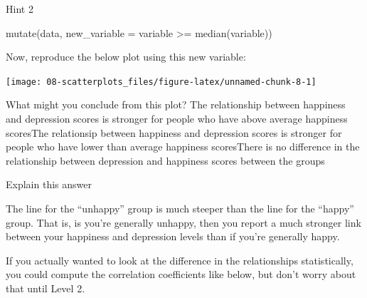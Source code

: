 \documentclass[
  oneside]{book}
\newenvironment{Shaded}{\begin{snugshade}}{\end{snugshade}}
\newcommand{\AttributeTok}[1]{\textcolor[rgb]{0.77,0.63,0.00}{#1}}
\newcommand{\ConstantTok}[1]{\textcolor[rgb]{0.00,0.00,0.00}{#1}}
\newcommand{\FunctionTok}[1]{\textcolor[rgb]{0.00,0.00,0.00}{#1}}
\newcommand{\NormalTok}[1]{#1}
\newcommand{\OtherTok}[1]{\textcolor[rgb]{0.56,0.35,0.01}{#1}}
\newcommand{\SpecialCharTok}[1]{\textcolor[rgb]{0.00,0.00,0.00}{#1}}
\begin{document}
Hint 2

\begin{Shaded}
\begin{Highlighting}[]
\FunctionTok{mutate}\NormalTok{(data, }\AttributeTok{new\_variable =}\NormalTok{ variable }\SpecialCharTok{\textgreater{}=} \FunctionTok{median}\NormalTok{(variable))}
\end{Highlighting}
\end{Shaded}

Now, reproduce the below plot using this new variable:

\begin{center}\texttt{[image: 08-scatterplots\_files/figure-latex/unnamed-chunk-8-1]} \end{center}

What might you conclude from this plot? The relationship between happiness and depression scores is stronger for people who have above average happiness scoresThe relationsip between happiness and depression scores is stronger for people who have lower than average happiness scoresThere is no difference in the relationship between depression and happiness scores between the groups

Explain this answer

The line for the ``unhappy'' group is much steeper than the line for the ``happy'' group. That is, is you're generally unhappy, then you report a much stronger link between your happiness and depression levels than if you're generally happy.

If you actually wanted to look at the difference in the relationships statistically, you could compute the correlation coefficients like below, but don't worry about that until Level 2.

\begin{Shaded}
\end{Shaded}
\end{document}
